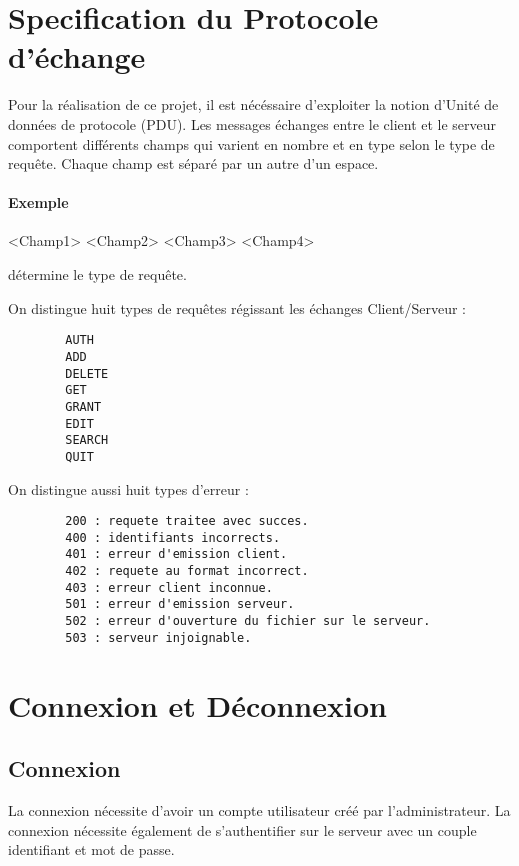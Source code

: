 \documentclass[10pt]{article}
\begin{document}
\section{Specification du Protocole d'échange}{
    Pour la réalisation de ce projet, il est nécéssaire d'exploiter la notion d'Unité de données de protocole (PDU). Les messages échanges entre le client et le serveur comportent différents champs qui varient en nombre et en type selon le type de requête. Chaque champ est séparé par un autre d'un espace.
	
	\paragraph{Exemple} <Champ1> <Champ2> <Champ3> <Champ4> \newline
	
	\noindent <Champ1> détermine le type de requête.
	
	\noindent On distingue huit types de requêtes régissant les échanges Client/Serveur :
	\begin{lstlisting}
        AUTH
        ADD
        DELETE
        GET
        GRANT
        EDIT
        SEARCH
        QUIT
    \end{lstlisting}
    
    On distingue aussi huit types d'erreur :
    \begin{lstlisting}
        200 : requete traitee avec succes.
        400 : identifiants incorrects.
        401 : erreur d'emission client.
        402 : requete au format incorrect.
        403 : erreur client inconnue.
        501 : erreur d'emission serveur.
        502 : erreur d'ouverture du fichier sur le serveur.
        503 : serveur injoignable.
    \end{lstlisting}
}
\pagebreak

\section{Connexion et Déconnexion}{
	
	\subsection{Connexion}{
	    La connexion nécessite d'avoir un compte utilisateur créé par l'administrateur.
	    La connexion nécessite également de s'authentifier sur le serveur avec un couple identifiant et mot de passe.
	}
}
\end{document}
